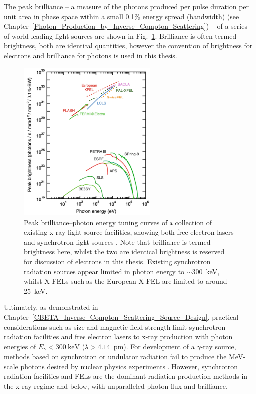 \documentclass[../main.tex]{subfiles}
\begin{document}
The peak brilliance -- a measure of the photons produced per pulse duration per unit area in phase space within a small 0.1\% energy spread (bandwidth) (see Chapter~\ref{Photon_Production_by_Inverse_Compton_Scattering}) -- of a series of world-leading light sources are shown in Fig.~\ref{fig:light_source_tuning_curves}. Brilliance is often termed brightness, both are identical quantities, however the convention of brightness for electrons and brilliance for photons is used in this thesis. 
\begin{figure}[!h]
\centering
\includegraphics[width=0.6\textwidth]{Figures/Introduction/Light_Source_Brilliance_Energy.pdf}
\caption{Peak brilliance--photon energy tuning curves of a collection of existing x-ray light source facilities, showing both free electron lasers and synchrotron light sources \cite{geloni2017physics}. Note that brilliance is termed brightness here, whilst the two are identical brightness is reserved for discussion of electrons in this thesis. Existing synchrotron radiation sources appear limited in photon energy to $\sim 300$~\si{\kilo\electronvolt}, whilst X-FELs such as the European X-FEL \cite{schneidmiller2011photon} are limited to around 25~\si{\kilo\electronvolt}.}
\label{fig:light_source_tuning_curves}
\end{figure}

Ultimately, as demonstrated in Chapter~\ref{CBETA_Inverse_Compton_Scattering_Source_Design}, practical considerations such as size and magnetic field strength limit synchrotron radiation facilities and free electron lasers to x-ray production with photon energies of $E_{\gamma} < 300~\si{\kilo\electronvolt}$ ($\lambda > 4.14$~\si{\pico\meter}). For development of a $\gamma$-ray source, methods based on synchrotron or undulator radiation fail to produce the \si{\mega\electronvolt}-scale photons desired by nuclear physics experiments \cite{budker2021expanding}. However, synchrotron radiation facilities and FELs are the dominant radiation production methods in the x-ray regime and below, with unparalleled photon flux and brilliance.  
\end{document}
